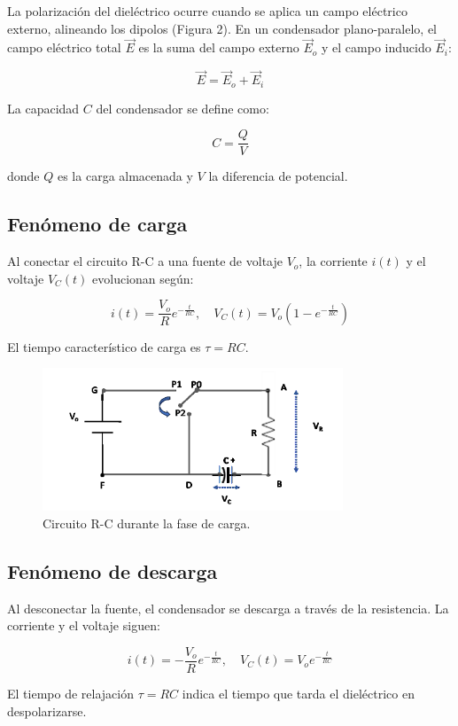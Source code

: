 \documentclass{article}
\begin{document}
La polarización del dieléctrico ocurre cuando se aplica un campo eléctrico externo, alineando los dipolos (Figura 2). En un condensador plano-paralelo, el campo eléctrico total \(\vec{E}\) es la suma del campo externo \(\vec{E}_o\) y el campo inducido \(\vec{E}_i\):

\[
\vec{E} = \vec{E}_o + \vec{E}_i
\]

La capacidad \(C\) del condensador se define como:

\[
C = \frac{Q}{V}
\]

donde \(Q\) es la carga almacenada y \(V\) la diferencia de potencial.

\subsection{Fenómeno de carga}
Al conectar el circuito R-C a una fuente de voltaje \(V_o\), la corriente \(i(t)\) y el voltaje \(V_C(t)\) evolucionan según:

\[
i(t) = \frac{V_o}{R} e^{-\frac{t}{RC}}, \quad V_C(t) = V_o \left(1 - e^{-\frac{t}{RC}}\right)
\]

El tiempo característico de carga es \(\tau = RC\).

\begin{figure}[h]
    \centering
    \includegraphics[width=0.8\textwidth]{circuito_carga.png}
    \caption{Circuito R-C durante la fase de carga.}
    \label{fig:carga}
\end{figure}

\subsection{Fenómeno de descarga}
Al desconectar la fuente, el condensador se descarga a través de la resistencia. La corriente y el voltaje siguen:

\[
i(t) = -\frac{V_o}{R} e^{-\frac{t}{RC}}, \quad V_C(t) = V_o e^{-\frac{t}{RC}}
\]

El tiempo de relajación \(\tau = RC\) indica el tiempo que tarda el dieléctrico en despolarizarse.
\end{document}
